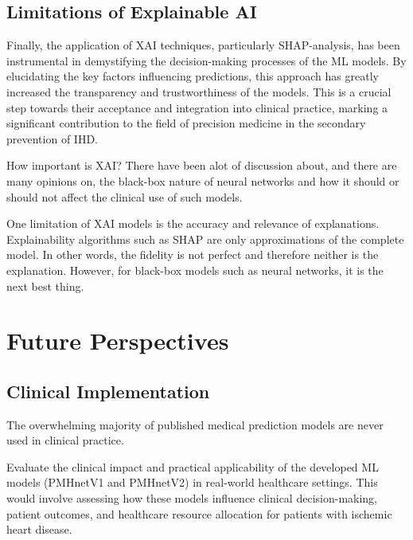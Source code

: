 \subsection{Limitations of Explainable AI}




Finally, the application of \ac{XAI} techniques, particularly
\ac{SHAP}-analysis, has been instrumental in demystifying the decision-making
processes of the \ac{ML} models. By elucidating the key factors influencing
predictions, this approach has greatly increased the transparency and
trustworthiness of the models. This is a crucial step towards their acceptance
and integration into clinical practice, marking a significant contribution to
the field of precision medicine in the secondary prevention of \ac{IHD}.


How important is XAI? 
There have been alot of discussion about, and there are many opinions on, 
the black-box nature of neural networks and 
how it should or should not affect the clinical use of such models.
\autocite{gunningXAI2019, vanderveldenExplainable2022}


One limitation of XAI models is the accuracy and relevance of explanations.
Explainability algorithms such as SHAP are only approximations
of the complete model.
In other words, the fidelity is not perfect and therefore neither
is the explanation.
However, for black-box models such as neural networks,
it is the next best thing.


\section{Future Perspectives}

\subsection{Clinical Implementation}

The overwhelming majority of published medical prediction models 
are never used in clinical practice.
~\autocite{steyerbergPrognosis2013}

Evaluate the clinical impact and practical applicability of the developed ML
models (PMHnetV1 and PMHnetV2) in real-world healthcare settings. This would
involve assessing how these models influence clinical decision-making, patient
outcomes, and healthcare resource allocation for patients with ischemic heart
disease.

